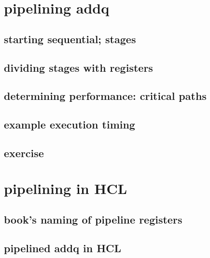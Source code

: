 

\section{pipelining addq}

\subsection{starting sequential; stages}



\subsection{dividing stages with registers}



\subsection{determining performance: critical paths}



\subsection{example execution timing}



\subsection{exercise}


\section{pipelining in HCL}

\subsection{book's naming of pipeline registers}



\subsection{pipelined addq in HCL}

